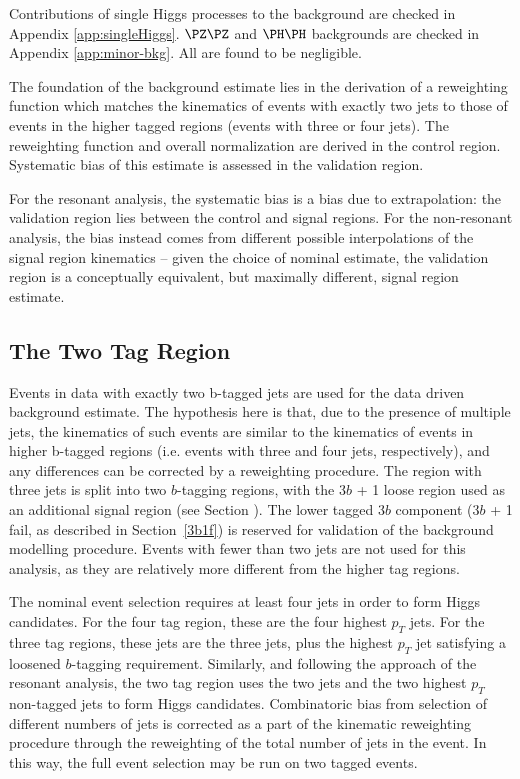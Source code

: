 Contributions of single Higgs processes to the background are checked in 
Appendix \ref{app:singleHiggs}. $\PZ\PZ$ and $\higgs\higgs$ backgrounds are checked 
in Appendix \ref{app:minor-bkg}. All are found to be negligible.

The foundation of the background estimate lies in the derivation of a
reweighting function which matches the kinematics of events with exactly two
\btagged jets to those of events in the higher tagged regions (events with three or four 
\btagged jets). The reweighting function and overall normalization are derived in 
the control region. Systematic bias of this estimate is assessed in the validation 
region. 

For the resonant analysis, the systematic bias is a bias due to extrapolation:
the validation region lies between the control and signal regions. For the 
non-resonant analysis, the bias instead comes from different possible interpolations
of the signal region kinematics -- given the choice of nominal estimate, the validation
region is a conceptually equivalent, but maximally different, signal region estimate.

\subsection{The Two Tag Region}

Events in data with exactly two b-tagged jets are used for the data driven 
background estimate. The hypothesis here is that, due to the presence of 
multiple \btagged jets, the kinematics of such events are similar to the 
kinematics of events in higher b-tagged regions (i.e. events with three and 
four \btagged jets, respectively), and any differences can be corrected by a 
reweighting procedure. The region with three \btagged jets is split into 
two $b$-tagging regions, with the 3$b$ + 1 loose region used as an additional signal 
region (see Section ). The lower tagged 3$b$ component 
(3$b$ + 1 fail, as described in Section~\ref{3b1f}) is reserved for validation
of the background modelling procedure. Events with fewer than two \btagged jets are not 
used for this analysis, as they are relatively more different from the higher tag regions.

The nominal event selection requires at least four jets in order to form Higgs
candidates. For the four tag region, these are the four highest $p_{T}$ \btagged 
jets. For the three tag regions, these jets are the three \btagged jets, plus the 
highest $p_{T}$ jet satisfying a loosened $b$-tagging requirement. Similarly, and following 
the approach of the resonant analysis, the two tag region uses the two \btagged jets 
and the two highest $p_{T}$ non-tagged jets to form Higgs candidates. Combinatoric bias 
from selection of different numbers of \btagged jets is corrected as a part of the kinematic 
reweighting procedure through the reweighting of the total number of jets in the event. In this way, 
the full event selection may be run on two tagged events. 

